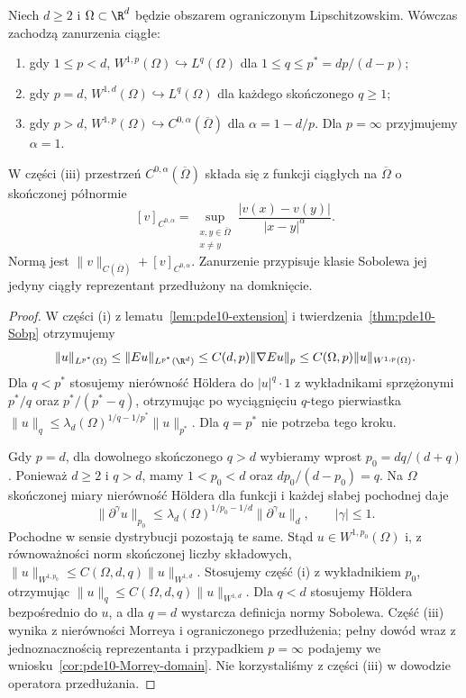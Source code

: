 \begin{twierdzenie}
\label{thm:pde10-domain-embed}
Niech $d\ge2$ i $\Omega\subset\R^d$ będzie obszarem ograniczonym Lipschitzowskim. Wówczas zachodzą zanurzenia ciągłe:
\begin{enumerate}[label=\textnormal{(\roman*)}]
\item gdy $1\le p<d$, $W^{1,p}(\Omega)\hookrightarrow
 L^q(\Omega)$ dla $1\le q\le p^*=dp/(d-p)$;
\item gdy $p=d$, $W^{1,d}(\Omega)\hookrightarrow L^q(\Omega)$
dla każdego skończonego $q\ge1$;
\item gdy $p>d$, $W^{1,p}(\Omega)\hookrightarrow
 C^{0,\alpha}(\overline\Omega)$ dla $\alpha=1-d/p$.
Dla $p=\infty$ przyjmujemy $\alpha=1$.
\end{enumerate}
W części (iii) przestrzeń $C^{0,\alpha}(\overline\Omega)$
składa się z funkcji ciągłych na $\overline\Omega$
o skończonej półnormie
\[
 [v]_{C^{0,\alpha}}=
 \sup_{\substack{x,y\in\overline\Omega\\x\ne y}}
 \frac{|v(x)-v(y)|}{|x-y|^\alpha}.
\]
Normą jest $\|v\|_{C(\overline\Omega)}+[v]_{C^{0,\alpha}}$.
Zanurzenie przypisuje klasie Sobolewa jej jedyny
ciągły reprezentant przedłużony na domknięcie.
\end{twierdzenie}
\begin{proof}
W części (i) z lematu~\ref{lem:pde10-extension}
i twierdzenia~\ref{thm:pde10-Sobp} otrzymujemy
\[
 \|u\|_{L^{p^*}(\Omega)}
 \le\|Eu\|_{L^{p^*}(\R^d)}
 \le C(d,p)\|\nabla Eu\|_p
 \le C(\Omega,p)\|u\|_{W^{1,p}(\Omega)}.
\]
Dla $q<p^*$ stosujemy nierówność Höldera do
$|u|^q\cdot1$ z wykładnikami sprzężonymi
$p^*/q$ oraz $p^*/(p^*-q)$, otrzymując po
wyciągnięciu $q$-tego pierwiastka
$\|u\|_q\le\lambda_d(\Omega)^{1/q-1/p^*}\|u\|_{p^*}$.
Dla $q=p^*$ nie potrzeba tego kroku.

Gdy $p=d$, dla dowolnego skończonego $q>d$
wybieramy wprost $p_0=dq/(d+q)$.
Ponieważ $d\ge2$ i $q>d$, mamy $1<p_0<d$
oraz $dp_0/(d-p_0)=q$.
Na $\Omega$ skończonej miary nierówność Höldera
dla funkcji i każdej słabej pochodnej daje
\[
 \|\partial^\gamma u\|_{p_0}
 \le\lambda_d(\Omega)^{1/p_0-1/d}
             \|\partial^\gamma u\|_d,\qquad |\gamma|\le1.
\]
Pochodne w sensie dystrybucji pozostają te same.
Stąd $u\in W^{1,p_0}(\Omega)$ i, z równoważności
norm skończonej liczby składowych,
$\|u\|_{W^{1,p_0}}\le C(\Omega,d,q)\|u\|_{W^{1,d}}$.
Stosujemy część (i) z wykładnikiem $p_0$,
otrzymując $\|u\|_q\le C(\Omega,d,q)\|u\|_{W^{1,d}}$.
Dla $q<d$ stosujemy Höldera bezpośrednio do $u$,
a dla $q=d$ wystarcza definicja normy Sobolewa.
Część (iii) wynika z nierówności Morreya
i ograniczonego przedłużenia; pełny dowód wraz
z jednoznacznością reprezentanta i przypadkiem
$p=\infty$ podajemy we wniosku~\ref{cor:pde10-Morrey-domain}.
Nie korzystaliśmy z części (iii) w dowodzie
operatora przedłużania.
\end{proof}

